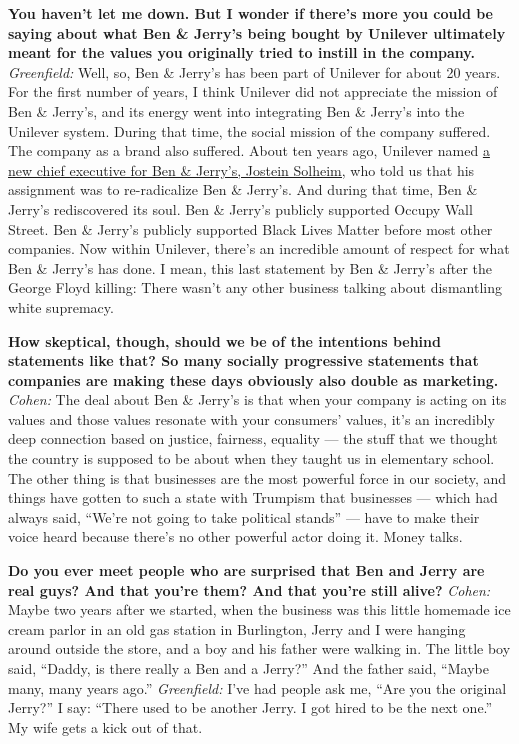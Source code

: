 \textbf{You haven't let me down. But I wonder if there's more you could
be saying about what Ben \& Jerry's being bought by Unilever ultimately
meant for the values you originally tried to instill in the company.}
\emph{Greenfield:} Well, so, Ben \& Jerry's has been part of Unilever
for about 20 years. For the first number of years, I think Unilever did
not appreciate the mission of Ben \& Jerry's, and its energy went into
integrating Ben \& Jerry's into the Unilever system. During that time,
the social mission of the company suffered. The company as a brand also
suffered. About ten years ago, Unilever named
\href{http://nytimes3xbfgragh.onion\#tooltip-13}{a new chief executive
for Ben \& Jerry's, Jostein Solheim,} who told us that his assignment
was to re-radicalize Ben \& Jerry's. And during that time, Ben \&
Jerry's rediscovered its soul. Ben \& Jerry's publicly supported Occupy
Wall Street. Ben \& Jerry's publicly supported Black Lives Matter before
most other companies. Now within Unilever, there's an incredible amount
of respect for what Ben \& Jerry's has done. I mean, this last statement
by Ben \& Jerry's after the George Floyd killing: There wasn't any other
business talking about dismantling white supremacy.

\textbf{How skeptical, though, should we be of the intentions behind
statements like that? So many socially progressive statements that
companies are making these days obviously also double as marketing.}
\emph{Cohen:} The deal about Ben \& Jerry's is that when your company is
acting on its values and those values resonate with your consumers'
values, it's an incredibly deep connection based on justice, fairness,
equality --- the stuff that we thought the country is supposed to be
about when they taught us in elementary school. The other thing is that
businesses are the most powerful force in our society, and things have
gotten to such a state with Trumpism that businesses --- which had
always said, ``We're not going to take political stands'' --- have to
make their voice heard because there's no other powerful actor doing it.
Money talks.

\textbf{Do you ever meet people who are surprised that Ben and Jerry are
real guys? And that you're them? And that you're still alive?}
\emph{Cohen:} Maybe two years after we started, when the business was
this little homemade ice cream parlor in an old gas station in
Burlington, Jerry and I were hanging around outside the store, and a boy
and his father were walking in. The little boy said, ``Daddy, is there
really a Ben and a Jerry?'' And the father said, ``Maybe many, many
years ago.'' \emph{Greenfield:} I've had people ask me, ``Are you the
original Jerry?'' I say: ``There used to be another Jerry. I got hired
to be the next one.'' My wife gets a kick out of that.

